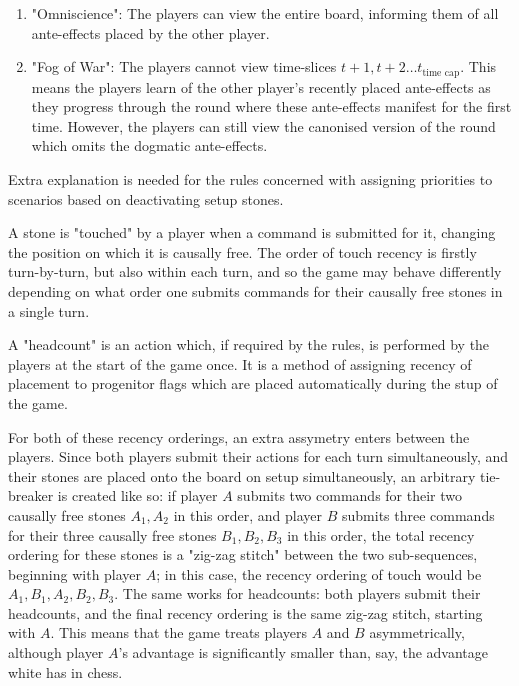 \documentclass[12pt]{article}
\begin{document}
\begin{enumerate}
\begin{enumerate}
			\item "Omniscience": The players can view the entire board, informing them of all ante-effects placed by the other player.
			\item "Fog of War": The players cannot view time-slices $t+1,t+2\dots t_{\text{time cap}}$. This means the players learn of the other player's recently placed ante-effects as they progress through the round where these ante-effects manifest for the first time. However, the players can still view the canonised version of the round which omits the dogmatic ante-effects.
		\end{enumerate}
	\end{enumerate}
	
	Extra explanation is needed for the rules concerned with assigning priorities to scenarios based on deactivating setup stones.
	
	A stone is "touched" by a player when a command is submitted for it, changing the position on which it is causally free. The order of touch recency is firstly turn-by-turn, but also within each turn, and so the game may behave differently depending on what order one submits commands for their causally free stones in a single turn.
	
	A "headcount" is an action which, if required by the rules, is performed by the players at the start of the game once. It is a method of assigning recency of placement to progenitor flags which are placed automatically during the stup of the game.
	
	For both of these recency orderings, an extra assymetry enters between the players. Since both players submit their actions for each turn simultaneously, and their stones are placed onto the board on setup simultaneously, an arbitrary tie-breaker is created like so: if player $A$ submits two commands for their two causally free stones $A_1,A_2$ in this order, and player $B$ submits three commands for their three causally free stones $B_1, B_2, B_3$ in this order, the total recency ordering for these stones is a "zig-zag stitch" between the two sub-sequences, beginning with player $A$; in this case, the recency ordering of touch would be $A_1,B_1,A_2,B_2,B_3$. The same works for headcounts: both players submit their headcounts, and the final recency ordering is the same zig-zag stitch, starting with $A$. This means that the game treats players $A$ and $B$ asymmetrically, although player $A$'s advantage is significantly smaller than, say, the advantage white has in chess.
	
	
	
	
	
	
	
	

	
	
\end{document}
